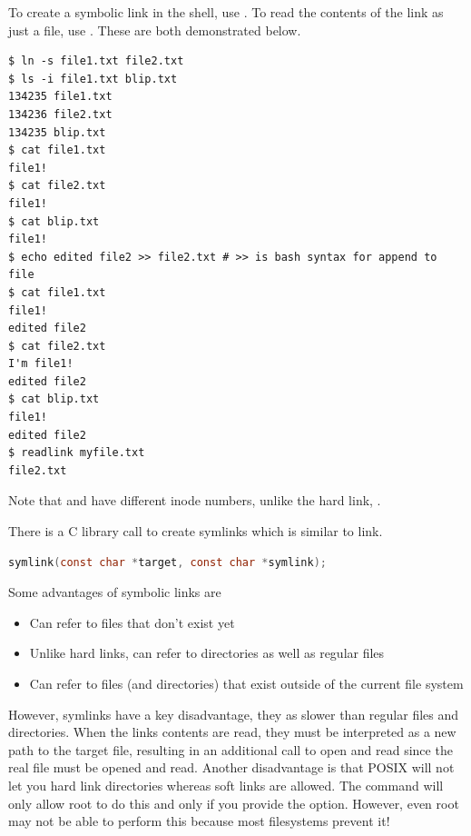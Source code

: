 \begin{enumerate}
        To create a symbolic link in the shell, use .
        To read the contents of the link as just a file, use .
        These are both demonstrated below.

\begin{verbatim}
$ ln -s file1.txt file2.txt
$ ls -i file1.txt blip.txt
134235 file1.txt
134236 file2.txt
134235 blip.txt
$ cat file1.txt
file1!
$ cat file2.txt
file1!
$ cat blip.txt
file1!
$ echo edited file2 >> file2.txt # >> is bash syntax for append to file
$ cat file1.txt
file1!
edited file2
$ cat file2.txt
I'm file1!
edited file2
$ cat blip.txt
file1!
edited file2
$ readlink myfile.txt
file2.txt
\end{verbatim}

        Note that  and  have different inode numbers, unlike the hard link, .

        There is a C library call to create symlinks which is similar to link.

        \begin{lstlisting}[language=C]
        symlink(const char *target, const char *symlink);
        \end{lstlisting}

        Some advantages of symbolic links are

        \begin{itemize}
            \tightlist
                \item Can refer to files that don't exist yet
                \item Unlike hard links, can refer to directories as well as regular files
                \item Can refer to files (and directories) that exist outside of the current file system
        \end{itemize}

        However, symlinks have a key disadvantage, they as slower than regular files and directories.
        When the links contents are read, they must be interpreted as a new path to the target file, resulting in an additional call to open and read since the real file must be opened and read.
        Another disadvantage is that POSIX will not let you hard link directories whereas soft links are allowed.
        The  command will only allow root to do this and only if you provide the  option.
        However, even root may not be able to perform this because most filesystems prevent it!
\end{enumerate}

